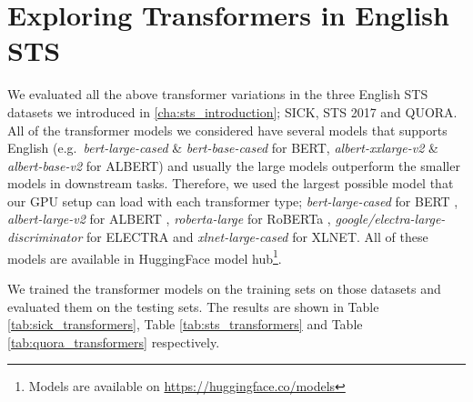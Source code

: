 \section{Exploring Transformers in English STS}
\label{sec:transformer_english}
We evaluated all the above transformer variations in the three English STS datasets we introduced in \ref{cha:sts_introduction}; SICK, STS 2017 and QUORA. All of the transformer models we considered have several models that supports English (e.g.\ \textit{bert-large-cased} \& \textit{bert-base-cased} for BERT, \textit{albert-xxlarge-v2} \& \textit{albert-base-v2} for ALBERT) and usually the large models outperform the smaller models in downstream tasks. Therefore, we used the largest possible model that our GPU setup can load with each transformer type; \textit{bert-large-cased} for BERT \autocite{devlin-etal-2019-bert}, \textit{albert-large-v2} for ALBERT \autocite{Lan2020ALBERT}, \textit{roberta-large} for RoBERTa \autocite{liu2019roberta}, \textit{google/electra-large-discriminator} for ELECTRA \autocite{Clark2020ELECTRA} and \textit{xlnet-large-cased}  \autocite{yang2019xlnet} for XLNET. All of these models are available in HuggingFace \autocite{wolf-etal-2020-transformers} model hub\footnote{Models are available on \url{https://huggingface.co/models}}.

We trained the transformer models on the training sets on those datasets and evaluated them on the testing sets. The results are shown in Table \ref{tab:sick_transformers}, Table \ref{tab:sts_transformers} and Table \ref{tab:quora_transformers} respectively. 

\begin{table}[htb]
	\centering
	\caption[Results for SICK with Transformer Models]{Results for SICK dataset with different variants of transformer models. For each variant, Pearson Correlation ($\bm{\rho}$) and Spearman Correlation ($\bm{\tau}$) are reported between the predicted values and the gold labels of the test set. Best result from all the variations is marked with ${\dagger}$.}  
	\label{tab:sick_transformers}
\end{table}


